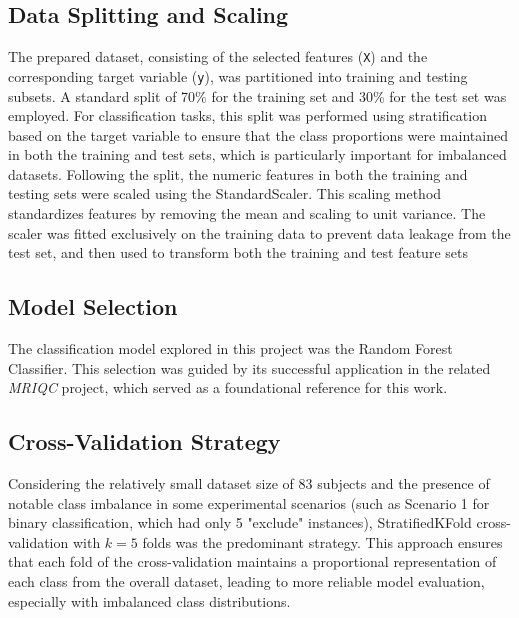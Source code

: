 \subsection{Data Splitting and Scaling}
\label{ssec:data_splitting_scaling_methods} %
The prepared dataset, consisting of the selected features (\texttt{X}) and the corresponding target variable (\texttt{y}), was partitioned into training and testing subsets. A standard split of 70\% for the training set and 30\% for the test set was employed. For classification tasks, this split was performed using stratification based on the target variable to ensure that the class proportions were maintained in both the training and test sets, which is particularly important for imbalanced datasets. Following the split, the numeric features in both the training and testing  sets were scaled using the StandardScaler. This scaling method standardizes features by removing the mean and scaling to unit variance. The scaler was fitted exclusively on the training data to prevent data leakage from the test set, and then used to transform both the training and test feature sets

\subsection{Model Selection}
\label{ssec:model_selection_methods} %
The classification model explored in this project was the Random Forest Classifier. This selection was guided by its successful application in the related \textit{MRIQC} project, which served as a foundational reference for this work.

\subsection{Cross-Validation Strategy}
\label{ssec:cv_strategy_methods} %
Considering the relatively small dataset size of 83 subjects and the presence of notable class imbalance in some experimental scenarios (such as Scenario 1 for binary classification, which had only 5 "exclude" instances), StratifiedKFold cross-validation with $k=5$ folds was the predominant strategy. This approach ensures that each fold of the cross-validation maintains a proportional representation of each class from the overall dataset, leading to more reliable model evaluation, especially with imbalanced class distributions.


